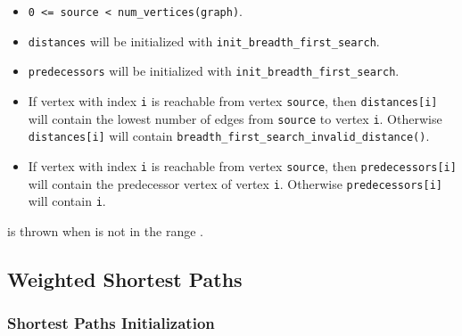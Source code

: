 \begin{itemdescr}
      \pnum\preconditions
            \begin{itemize}
                  \item
                        \lstinline{0 <= source < num_vertices(graph)}. 
                  \item
                        \lstinline{distances} will be initialized with \lstinline{init_breadth_first_search}.
                  \item
                        \lstinline{predecessors} will be initialized with \lstinline{init_breadth_first_search}.
            \end{itemize}
      \pnum\effects
            \begin{itemize}
                  \item
                        If vertex with index \lstinline{i} is reachable from vertex \lstinline{source}, then
                        \lstinline{distances[i]} will contain the lowest number of edges from \lstinline{source} to vertex
                        \lstinline{i}.  Otherwise \lstinline{distances[i]} will contain
                        \lstinline{breadth_first_search_invalid_distance()}.
                  \item
                        If vertex with index \lstinline{i} is reachable
                        from vertex \lstinline{source}, then \lstinline{predecessors[i]} will contain the
                        predecessor vertex of vertex \lstinline{i}. Otherwise \lstinline{predecessors[i]} will contain
                        \lstinline{i}.
            \end{itemize}
      \pnum\throws {} is thrown when  is not in the range .  \\
\end{itemdescr}


\subsection{Weighted Shortest Paths}

\subsubsection{Shortest Paths Initialization}

